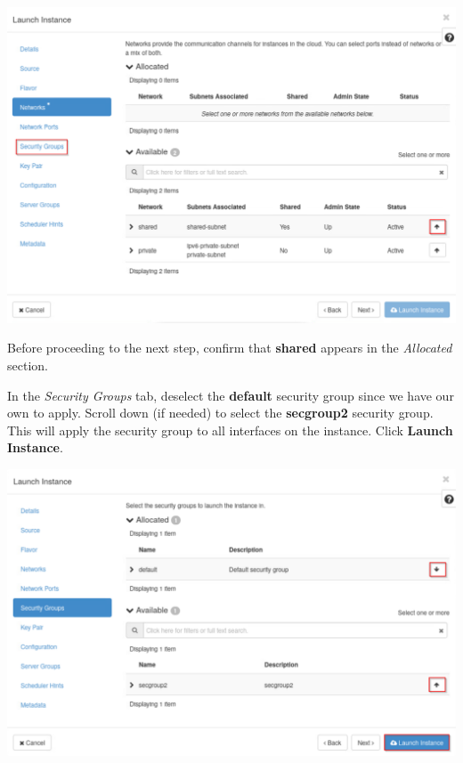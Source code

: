 \documentclass[letterpaper, 12pt]{article}
\begin{document}
\begin{enumerate}
\begin{labstep}
        \begin{center}
            \includegraphics[width=\linewidth]{images/part2/step14.png}
        \end{center}
    \end{labstep}

    \begin{stopbox}
        Before proceeding to the next step, confirm that \textbf{shared} appears in the \textit{Allocated} section.
    \end{stopbox}

    \begin{labstep}
        In the \textit{Security Groups} tab, deselect the \textbf{default} security group since we have our own to apply.
        Scroll down (if needed) to select the \textbf{secgroup2} security group.
        This will apply the security group to all interfaces on the instance.
        Click \textbf{Launch Instance}.

        \begin{center}
            \includegraphics[width=\linewidth]{images/part2/step15.png}
        \end{center}
    \end{labstep}


\end{enumerate}
\end{document}

